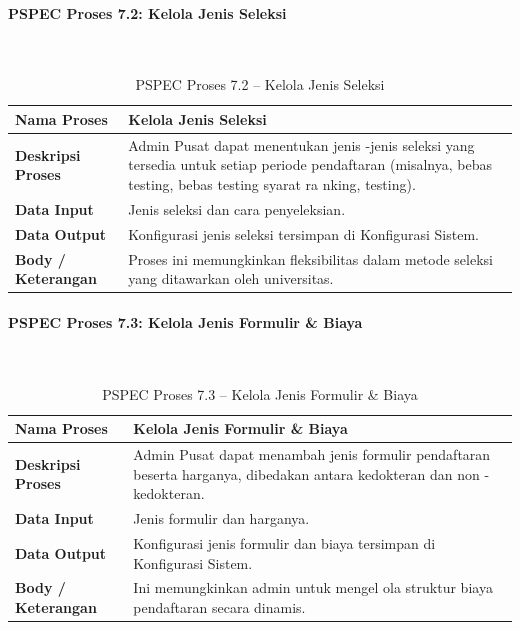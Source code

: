 \paragraph{PSPEC Proses 7.2: Kelola Jenis Seleksi}~\\
\begin{longtable}{|p{}|p{}|}
	\caption{PSPEC Proses 7.2 -- Kelola Jenis Seleksi}
	\label{table:3.pspec72}\\
	\hline
	\textbf{Nama Proses} & Kelola Jenis Seleksi \\
	\hline
	\textbf{Deskripsi Proses} & Admin Pusat dapat menentukan jenis -jenis seleksi yang tersedia untuk setiap periode pendaftaran (misalnya, bebas testing, bebas testing syarat ra nking, testing). \\
	\hline
	\textbf{Data Input} & Jenis seleksi dan cara penyeleksian. \\
	\hline
	\textbf{Data Output} & Konfigurasi jenis seleksi tersimpan di Konfigurasi Sistem. \\
	\hline
	\textbf{Body / Keterangan} & Proses ini memungkinkan fleksibilitas dalam metode seleksi yang ditawarkan oleh universitas. \\
	\hline
\end{longtable}

\paragraph{PSPEC Proses 7.3: Kelola Jenis Formulir \& Biaya}~\\
\begin{longtable}{|p{}|p{}|}
	\caption{PSPEC Proses 7.3 -- Kelola Jenis Formulir \& Biaya}
	\label{table:3.pspec73}\\
	\hline
	\textbf{Nama Proses} & Kelola Jenis Formulir \& Biaya \\
	\hline
	\textbf{Deskripsi Proses} & Admin Pusat dapat menambah jenis formulir pendaftaran beserta harganya, dibedakan antara kedokteran dan non -kedokteran. \\
	\hline
	\textbf{Data Input} & Jenis formulir dan harganya. \\
	\hline
	\textbf{Data Output} & Konfigurasi jenis formulir dan biaya tersimpan di Konfigurasi Sistem. \\
	\hline
	\textbf{Body / Keterangan} & Ini memungkinkan admin untuk mengel ola struktur biaya pendaftaran secara dinamis. \\
	\hline
\end{longtable}

